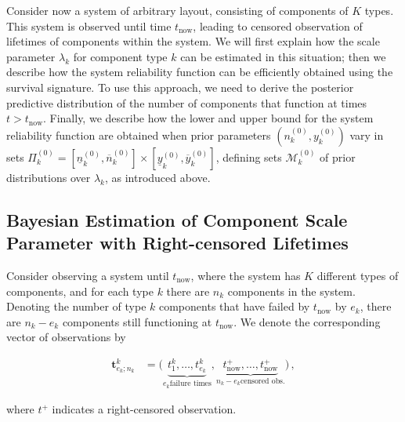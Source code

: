 \documentclass[Journal,letterpaper]{ascelike-new}
\renewcommand{\vec}[1]{{\bm#1}}
\newcommand{\uz}{^{(0)}} %
\newcommand{\ul}[1]{\underline{#1}}
\newcommand{\ol}[1]{\overline{#1}}
\def\ykz{y\uz_k}
\def\ykzl{\ul{y}\uz_k}
\def\ykzu{\ol{y}\uz_k}
\def\nkz{n\uz_k}
\def\nkzl{\ul{n}\uz_k}
\def\nkzu{\ol{n}\uz_k}
\def\MkZ{\mathcal{M}\uz_k}
\def\PkZ{\Pi\uz_k}
\def\tnow{t_\text{now}}
\def\tpnow{t^+_\text{now}}
\begin{document}
Consider now a system of arbitrary layout,
consisting of components of $K$ types.
This system is observed until time $\tnow$,
leading to censored observation of lifetimes of components within the system.
We will first explain %
how the scale parameter $\lambda_k$ for component type $k$
can be estimated in this situation;
%
then we describe
how the system reliability function can be efficiently obtained using the survival signature.
%
To use this approach, we need to derive the posterior predictive distribution
of the number of components that function at times $t > \tnow$.
%
Finally, we describe how
the lower and upper bound for the system reliability function
are obtained when prior parameters $(\nkz,\ykz)$
vary in sets $\PkZ = [\nkzl,\nkzu] \times [\ykzl,\ykzu]$,
defining sets $\MkZ$ of prior distributions over $\lambda_k$,
as introduced above. %


\subsection{Bayesian Estimation of Component Scale Parameter with Right-censored Lifetimes}
\label{sec:lambdawithcens}

Consider observing a system until $\tnow$,
where the system has $K$ different types of components,
and for each type $k$ there are $n_k$ components in the system.
Denoting the number of type $k$ components that have failed by $\tnow$ by $e_k$,
there are $n_k - e_k$ components still functioning at $\tnow$.
We denote the corresponding vector of observations by
\begin{linenomath*}
\begin{align}
\vec{t}^k_{e_k;n_k} &= \big( \underbrace{t^k_1, \ldots, t^k_{e_k}}_{e_k \text{failure times}},
                             \underbrace{\tpnow, \ldots, \tpnow}_{n_k-e_k \text{censored obs.}} \big)\,,
\end{align}
\end{linenomath*}
where $t^+$ indicates a right-censored observation.
\end{document}
